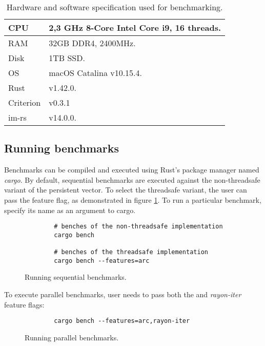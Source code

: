\begin{table}[!htbp]
    \centering

    \begin{tabular} { |l| p{11cm} | }
        \hline CPU & 2,3 GHz 8-Core Intel Core i9, 16 threads. \\ \hline
        RAM & 32GB DDR4, 2400MHz. \\ \hline
        Disk & 1TB SSD. \\ \hline
        OS & macOS Catalina v10.15.4. \\ \hline
        Rust & v1.42.0. \\ \hline
        Criterion & v0.3.1 \\ \hline
        im-rs & v14.0.0. \\ \hline
    \end{tabular}

    \label{tab:exec-environment}
    \caption{Hardware and software specification used for benchmarking.}
\end{table}

\subsection{Running benchmarks}
Benchmarks can be compiled and executed using Rust's package manager named \emph{cargo}. By default, sequential benchmarks are executed against the non-threadsafe variant of the persistent vector. To select the threadsafe variant, the user can pass the \arc{} feature flag, as demonstrated in figure \ref{fig:sequential-benches}. To run a particular benchmark, specify its name as an argument to cargo.

\begin{figure}[!htbp]
    \centering

    \begin{verbatim}
        # benches of the non-threadsafe implementation
        cargo bench

        # benches of the threadsafe implementation
        cargo bench --features=arc
    \end{verbatim}

    \caption{Running sequential benchmarks.}
    \label{fig:sequential-benches}
\end{figure}

To execute parallel benchmarks, user needs to pass both the \arc{} and \emph{rayon-iter} feature flags:
\begin{figure}[!htbp]
    \centering

    \begin{verbatim}
        cargo bench --features=arc,rayon-iter
    \end{verbatim}

    \caption{Running parallel benchmarks.}
    \label{fig:parallel-benches}
\end{figure}

